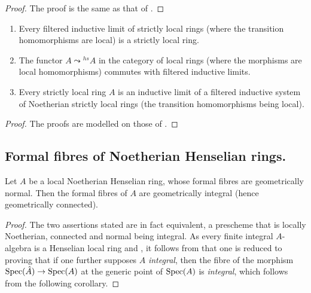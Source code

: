 \begin{proof}
The proof is the same as that of .
\end{proof}

\begin{proposition}[18.8.18]
\label{IV.18.8.18}
\begin{enumerate}[label=\emph{\roman*)}]
  \item Every filtered inductive limit of strictly local rings (where the transition homomorphisms are local) is a strictly local ring.
  \item The functor $A\leadsto{}^{hs}\!A$ in the category of local rings (where the morphisms are local homomorphisms) commutes with filtered inductive limits.
  \item Every strictly local ring $A$ is an inductive limit of a filtered inductive system of Noetherian strictly local rings (the transition homomorphisms being local).
\end{enumerate}
\end{proposition}

\begin{proof}
The proofs are modelled on those of .
\end{proof}


\subsection{Formal fibres of Noetherian Henselian rings.}
\label{subsection:IV.18.9}

\begin{theorem}[18.9.1]
\label{IV.18.9.1}
Let $A$ be a local Noetherian Henselian ring, whose formal fibres are geometrically normal.
Then the formal fibres of $A$ are geometrically integral \textup{(hence} geometrically connected\textup{)}.
\end{theorem}

\begin{proof}
The two assertions stated are in fact equivalent, a prescheme that is locally Noetherian, connected and normal being integral.
As every finite integral $A$-algebra is a Henselian local ring  and , it follows from  that one is reduced to proving that if one further supposes $A$ \emph{integral}, then the fibre of the morphism $\operatorname{Spec}(\hat{A})\to\operatorname{Spec}(A)$ at the generic point of $\operatorname{Spec}(A)$ is \emph{integral}, which follows from the following corollary.
\end{proof}


